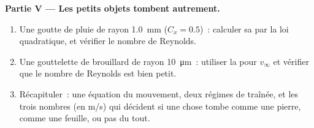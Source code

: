 \begin{problem}
\medskip
\noindent\textbf{Partie V --- Les petits objets tombent autrement.}
\begin{enumerate}[resume]
  \item Une goutte de pluie de rayon \qty{1.0}{mm} ($C_x = 0.5$)~:
        calculer sa  par la loi quadratique, et vérifier
        le nombre de Reynolds.
  \item Une gouttelette de brouillard de rayon \qty{10}{\micro m}~:
        utiliser la  pour $v_\infty$ et vérifier que le
        nombre de Reynolds est bien petit.
  \item Récapituler~: une équation du mouvement, deux régimes de
        traînée, et les trois nombres (en \unit{m/s}) qui décident si
        une chose tombe comme une pierre, comme une feuille, ou pas du tout.
\end{enumerate}
\end{problem}
